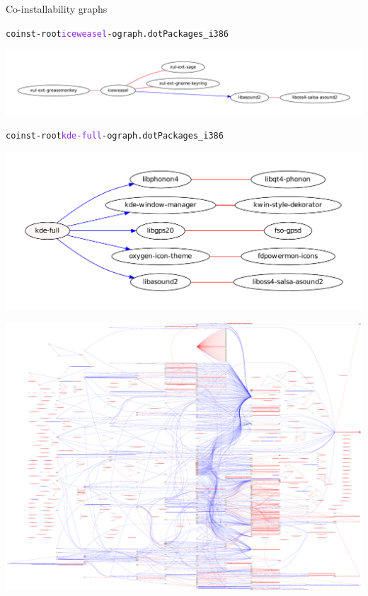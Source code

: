 \documentclass[xcolor={dvipsnames}]{beamer}
\newcommand{\EEE}[1]{\textcolor{BlueViolet}{#1}}
\begin{document}
\begin{frame}[fragile]{Co-installability graphs}
\begin{alltt}
coinst -root \EEE{iceweasel} -o graph.dot Packages_i386
\end{alltt}
\vspace{-2.5em}
\begin{center}
\includegraphics[width=\linewidth]{figures/iceweasel.pdf}
\end{center}
\vspace{-2em}
\begin{alltt}
coinst -root \EEE{kde-full} -o graph.dot Packages_i386
\end{alltt}
\vspace{-2.5em}
\begin{center}
\includegraphics[width=0.65\linewidth]{figures/kde-full.pdf}
\end{center}
\end{frame}

\begin{frame}
\begin{center}
\includegraphics[width=\linewidth]{figures/flattened}
\end{center}
\end{frame}
\end{document}
